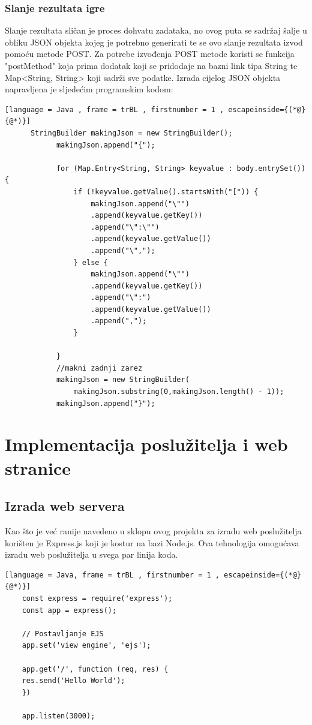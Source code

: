 \documentclass[times, utf8, zavrsni]{fer}
\begin{document}
	\subsection{Slanje rezultata igre}
	Slanje rezultata sličan je proces dohvatu zadataka, no ovog puta se sadržaj šalje u obliku JSON objekta kojeg je potrebno generirati te se ovo slanje rezultata izvod pomoću metode POST. 
	Za potrebe izvođenja POST metode koristi se funkcija "postMethod" koja prima dodatak koji se pridodaje na bazni link tipa String te Map<String, String> koji sadrži sve podatke. 
	Izrada cijelog JSON objekta napravljena je sljedećim programskim kodom:
	\begin{lstlisting}[language = Java , frame = trBL , firstnumber = 1 , escapeinside={(*@}{@*)}]
	  StringBuilder makingJson = new StringBuilder();
            makingJson.append("{");

            for (Map.Entry<String, String> keyvalue : body.entrySet()) {
                if (!keyvalue.getValue().startsWith("[")) {
                    makingJson.append("\"")
					.append(keyvalue.getKey())
					.append("\":\"")
					.append(keyvalue.getValue())
					.append("\",");
                } else {
                    makingJson.append("\"")
					.append(keyvalue.getKey())
					.append("\":")
					.append(keyvalue.getValue())
					.append(",");
                }

            }
            //makni zadnji zarez
            makingJson = new StringBuilder(
				makingJson.substring(0,makingJson.length() - 1));
            makingJson.append("}");
	\end{lstlisting}
	
	
	
\chapter{Implementacija poslužitelja i web stranice}
	\section{Izrada web servera}
	Kao što je već ranije navedeno u sklopu ovog projekta za izradu web poslužitelja korišten je Express.js koji je kostur na bazi Node.js. Ova tehnologija omogućava izradu web poslužitelja u svega par linija koda.
	\begin{lstlisting}[language = Java, frame = trBL , firstnumber = 1 , escapeinside={(*@}{@*)}]
	const express = require('express');
	const app = express();
 
	// Postavljanje EJS
	app.set('view engine', 'ejs');
 
	app.get('/', function (req, res) {
    res.send('Hello World');
	})

	app.listen(3000);
	\end{lstlisting}
	
\end{document}
